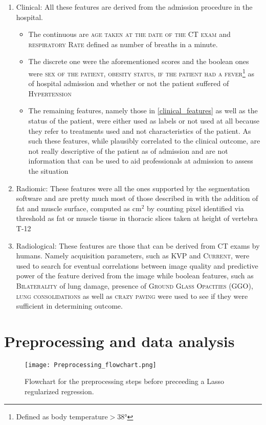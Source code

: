 \begin{enumerate}
\item Clinical: All these features are derived from the admission procedure in the hospital.
	\begin{itemize}
        \item The continuous are {\scshape age taken at the date of the CT exam} and {\scshape respiratory Rate} defined as number of breaths in a minute.
		\item The discrete one were the aforementioned scores and the boolean ones were {\scshape sex of the patient, obesity status, if the patient had a fever}\footnote{Defined as body temperature$>$38°} as of hospital admission and whether or not the patient suffered of {\scshape Hypertension}
		\item The remaining features, namely those in \ref{clinical_features} as well as the \death status of the patient, were either used as labels or not used at all because they refer to treatments used and not characteristics of the patient. As such these features, while plausibly correlated to the clinical outcome, are not really descriptive of the patient as of admission and are not information that can be used to aid professionals at admission to assess the situation
	\end{itemize}
\item Radiomic: These features were all the ones supported by the segmentation software and are pretty much most of those described in \cite{IBSI} with the addition of fat and muscle surface, computed as cm$^2$ by counting pixel identified via threshold as fat or muscle tissue in thoracic slices taken at height of vertebra T-12
\item Radiological: These features are those that can be derived from CT exams by humans. Namely acquisition parameters, such as {\scshape KVP} and {\scshape Current}, were used to search for eventual correlations between image quality and predictive power of the feature derived from the image while boolean features, such as {\scshape Bilaterality} of lung damage, presence of {\scshape Ground Glass Opacities (GGO)}, {\scshape lung consolidations} as well as {\scshape crazy paving} were used to see if they were sufficient in determining outcome.
\end{enumerate}

\section{Preprocessing and data analysis}
\begin{figure}
\texttt{[image: Preprocessing\_flowchart.png]}
\caption{Flowchart for the preprocessing steps before preceeding a Lasso regularized regression. \label{fig:preprocFlowchart}}
\end{figure}

